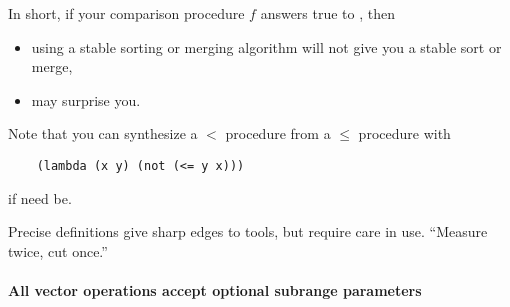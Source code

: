
In short, if your comparison procedure $f$ answers true to , then 
\begin{itemize}
\item using a stable sorting or merging algorithm will not give you a
  stable sort or merge, 
\item {} may surprise you.
\end{itemize}
Note that  you can synthesize a $<$ procedure from a $\leq$ procedure with
\begin{verbatim}
    (lambda (x y) (not (<= y x)))
\end{verbatim}
if need be. 

Precise definitions give sharp edges to tools, but require care in use. 
``Measure twice, cut once.''


\paragraph{All vector operations accept optional subrange parameters}

